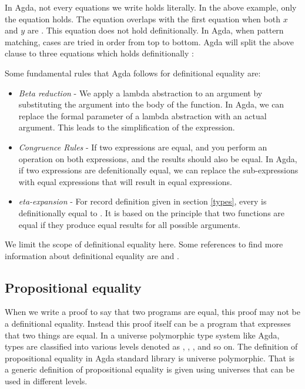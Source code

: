 In Agda, not every equations we write holds literally. In the above example,
only the equation  holds. The equation  overlaps with the first equation when both $x$ and $y$ are
. This equation does not hold definitionally. In Agda, when pattern
matching, cases are tried in order from top to bottom. Agda will split the above
clause to three equations which holds definitionally \cite{abel2012agda}:
\begin{description}
  \item[] 
  \item[] 
  \item[] 
\end{description}

Some fundamental rules that Agda follows for definitional equality are: 
\begin{itemize}
  \item \emph{Beta reduction} - We apply a lambda abstraction to an argument by
  substituting the argument into the body of the function. In Agda, we can
  replace the formal parameter of a lambda abstraction with an actual argument.
  This leads to the simplification of the expression.
  \item \emph{Congruence Rules} - If two expressions are equal, and you perform
  an operation on both expressions, and the results should also be equal. In
  Agda, if two expressions are defenitionally equal, we can replace the
  sub-expressions with equal expressions that will result in equal expressions.
  \item \emph{eta-expansion} - For record definition  given in
  section \ref{types}, every  is definitionally equal to
  . It is based on
  the principle that two functions are equal if they produce equal results for
  all possible arguments. 
\end{itemize}

We limit the scope of definitional equality here. Some references to find more
information about definitional equality are \cite{norell2007towards} and
\cite{martin1984intuitionistic}. 

\subsection{Propositional equality}
When we write a proof to say that two programs are equal, this proof may not be
a definitional equality. Instead this proof itself can be a program that
expresses that two things are equal. In a universe polymorphic type system like
Agda, types are classified into various levels denoted as , ,
, and so on. The definition of propositional equality in Agda standard
library is universe polymorphic. That is a generic definition of propositional
equality is given using universes that can be used in different levels.

